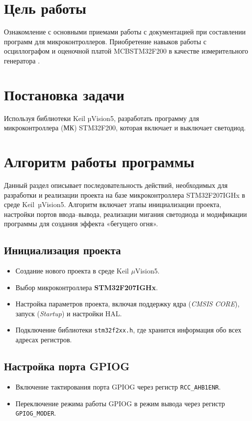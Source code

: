 \documentclass[a4paper, final]{article}
\begin{document}
\section{Цель работы}
Ознакомление с основными приемами работы с документацией при
составлении программ для микроконтроллеров. Приобретение навыков работы с
осциллографом и оценочной платой MCBSTM32F200 в качестве измерительного
генератора	.

\section{Постановка задачи}
Используя библиотеки Keil µVision5, разработать
программу для микроконтроллера (МК) STM32F200, которая включает и выключает
светодиод.

\section{Алгоритм работы программы}

Данный раздел описывает последовательность действий, необходимых для разработки и реализации проекта на базе микроконтроллера STM32F207IGHx в среде Keil~µVision5. Алгоритм включает этапы инициализации проекта, настройки портов ввода–вывода, реализации мигания светодиода и модификации программы для создания эффекта «бегущего огня».

\subsection{Инициализация проекта}
\begin{itemize}
    \item Создание нового проекта в среде Keil \(\mu\)Vision5.
    \item Выбор микроконтроллера \textbf{STM32F207IGHx}.
    \item Настройка параметров проекта, включая поддержку ядра (\textit{CMSIS CORE}), запуск (\textit{Startup}) и настройки HAL.
    \item Подключение библиотеки \texttt{stm32f2xx.h}, где хранится информация обо всех адресах регистров.
\end{itemize}

\subsection{Настройка порта GPIOG}
\begin{itemize}
    \item Включение тактирования порта GPIOG через регистр \texttt{RCC\_AHB1ENR}.
    \item Переключение режима работы GPIOG в режим вывода через регистр \texttt{GPIOG\_MODER}.
\end{itemize}
\end{document}
